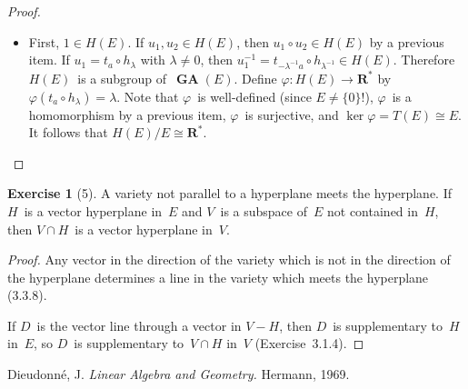 \documentclass[letterpaper,12pt]{article}
\newcommand{\R}{\mathbf{R}}
\newcommand{\Rnz}{\R^*}
\newcommand{\iso}{\cong}
\newcommand{\sect}{\cap}
\newcommand{\after}{\circ}
\DeclareMathOperator{\GA}{\mathbf{GA}}
\newcommand{\inv}[1]{#1^{-1}}
\theoremstyle{definition}
\newtheorem*{exer}{Exercise}
\theoremstyle{remark}
\begin{document}
\begin{proof}
\begin{itemize}[itemsep=0pt]
\item First, \(1\in H(E)\). If \(u_1,u_2\in H(E)\), then \(u_1\after u_2\in H(E)\) by a previous item. If \(u_1=t_a\after h_{\lambda}\) with \(\lambda\ne0\), then \(\inv{u_1}=t_{-\lambda^{-1}a}\after h_{\lambda^{-1}}\in H(E)\). Therefore \(H(E)\)~is a subgroup of~\(\GA(E)\). Define \(\varphi:H(E)\to\Rnz\) by \(\varphi(t_a\after h_{\lambda})=\lambda\). Note that \(\varphi\)~is well-defined (since \(E\ne\{0\}\)!), \(\varphi\)~is a homomorphism by a previous item, \(\varphi\)~is surjective, and \(\ker\varphi=T(E)\iso E\). It follows that \(H(E)/E\iso\Rnz\).\qedhere
\end{itemize}
\end{proof}

\begin{exer}[5]
A variety not parallel to a hyperplane meets the hyperplane. If \(H\)~is a vector hyperplane in~\(E\) and \(V\)~is a subspace of~\(E\) not contained in~\(H\), then \(V\sect H\)~is a vector hyperplane in~\(V\).
\end{exer}
\begin{proof}
Any vector in the direction of the variety which is not in the direction of the hyperplane determines a line in the variety which meets the hyperplane (3.3.8).

If \(D\)~is the vector line through a vector in \(V-H\), then \(D\)~is supplementary to~\(H\) in~\(E\), so \(D\)~is supplementary to~\(V\sect H\) in~\(V\) (Exercise~3.1.4).
\end{proof}

\begin{thebibliography}{0}
 Dieudonn\'e, J. \textit{Linear Algebra and Geometry.} Hermann, 1969.
\end{thebibliography}
\end{document}
